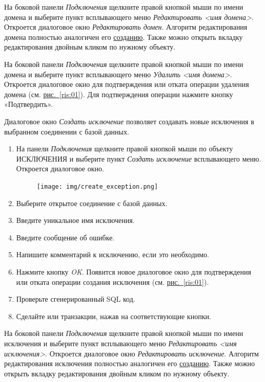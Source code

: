 На боковой панели \textit{Подключения} щелкните правой кнопкой мыши по имени домена и выберите пункт всплывающего меню \textit{Редактировать <имя домена>}. Откроется диалоговое окно \textit{Редактировать домен}. Алгоритм редактирования домена полностью аналогичен его \hyperref[sec:crdomain]{созданию}.
Также можно открыть вкладку редактирования двойным кликом по нужному объекту. 

На боковой панели \textit{Подключения} щелкните правой кнопкой мыши по имени домена и выберите пункт всплывающего меню \textit{Удалить <имя домена>}. Откроется  диалоговое окно для подтверждения или отката операции удаления домена (см. \hyperref[ris:01]{рис.~\ref{ris:01}}). Для подтверждения операции нажмите кнопку «Подтвердить».




\label{sec:crexc}

Диалоговое окно \textit{Создать исключение} позволяет создавать новые исключения в выбранном соединении с базой данных.

\begin{enumerate}[leftmargin=26pt]
	\item На панели \textit{Подключения} щелкните правой кнопкой мыши по объекту ИСКЛЮЧЕНИЯ и выберите пункт \textit{Создать исключение} всплывающего меню. Откроется диалоговое окно.
	\begin{figure}[H]
		\centering
		\texttt{[image: img/create\_exception.png]}
	\end{figure}
	\item Выберите открытое соединение с базой данных.
	\item Введите уникальное имя исключения.
	\item Введите сообщение об ошибке.
	\item Напишите комментарий к исключению, если это необходимо.
	\item Нажмите кнопку \textit{OK}. Появится новое диалоговое окно для подтверждения или отката операции создания исключения (см. \hyperref[ris:01]{рис.~\ref{ris:01}}).
	\item Проверьте сгенерированный SQL код.
	\item Сделайте   или  транзакции, нажав на соответствующие кнопки.
\end{enumerate}

На боковой панели \textit{Подключения} щелкните правой кнопкой мыши по имени исключения и выберите пункт всплывающего меню \textit{Редактировать <имя исключения>}. Откроется диалоговое окно \textit{Редактировать исключение}. Алгоритм редактирования исключения полностью аналогичен его \hyperref[sec:crexc]{созданию}.
Также можно открыть вкладку редактирования двойным кликом по нужному объекту. 

